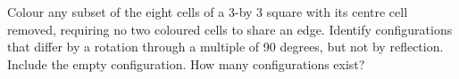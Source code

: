 Colour any subset of the eight cells of a 3-by 3 square with its centre cell removed, requiring no two coloured cells to share an edge. Identify configurations that differ by a rotation through a multiple of 90 degrees, but not by reflection. Include the empty configuration. How many configurations exist?
